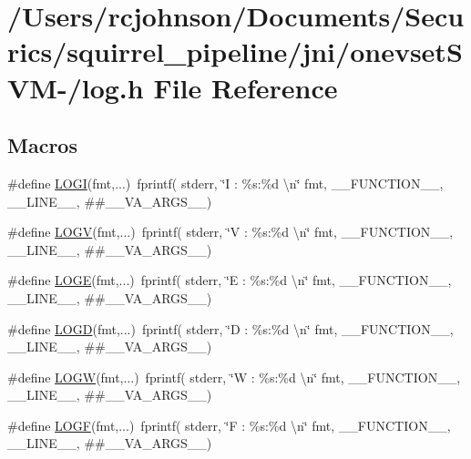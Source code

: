 \hypertarget{onevset_s_v_m-_2log_8h}{\section{/\-Users/rcjohnson/\-Documents/\-Securics/squirrel\-\_\-pipeline/jni/onevset\-S\-V\-M-\//log.h File Reference}
\label{onevset_s_v_m-_2log_8h}
}
\subsection*{Macros}
\begin{DoxyCompactItemize}
\item 
\#define \hyperlink{onevset_s_v_m-_2log_8h_a92abf411d2087c8985085d430336626c}{L\-O\-G\-I}(fmt,...)~fprintf( stderr, \char`\"{}I \-: \%s\-:\%d \textbackslash{}n\char`\"{} fmt, \-\_\-\-\_\-\-F\-U\-N\-C\-T\-I\-O\-N\-\_\-\-\_\-, \-\_\-\-\_\-\-L\-I\-N\-E\-\_\-\-\_\-, \#\#\-\_\-\-\_\-\-V\-A\-\_\-\-A\-R\-G\-S\-\_\-\-\_\-)
\item 
\#define \hyperlink{onevset_s_v_m-_2log_8h_ae73e6e027cb8b77a969c9dfcbc8bfc54}{L\-O\-G\-V}(fmt,...)~fprintf( stderr, \char`\"{}V \-: \%s\-:\%d \textbackslash{}n\char`\"{} fmt, \-\_\-\-\_\-\-F\-U\-N\-C\-T\-I\-O\-N\-\_\-\-\_\-, \-\_\-\-\_\-\-L\-I\-N\-E\-\_\-\-\_\-, \#\#\-\_\-\-\_\-\-V\-A\-\_\-\-A\-R\-G\-S\-\_\-\-\_\-)
\item 
\#define \hyperlink{onevset_s_v_m-_2log_8h_aad0ba517f6ba41ca750a26340b91ec85}{L\-O\-G\-E}(fmt,...)~fprintf( stderr, \char`\"{}E \-: \%s\-:\%d \textbackslash{}n\char`\"{} fmt, \-\_\-\-\_\-\-F\-U\-N\-C\-T\-I\-O\-N\-\_\-\-\_\-, \-\_\-\-\_\-\-L\-I\-N\-E\-\_\-\-\_\-, \#\#\-\_\-\-\_\-\-V\-A\-\_\-\-A\-R\-G\-S\-\_\-\-\_\-)
\item 
\#define \hyperlink{onevset_s_v_m-_2log_8h_a48bbf993b1b3c921f9576776376abd2b}{L\-O\-G\-D}(fmt,...)~fprintf( stderr, \char`\"{}D \-: \%s\-:\%d \textbackslash{}n\char`\"{} fmt, \-\_\-\-\_\-\-F\-U\-N\-C\-T\-I\-O\-N\-\_\-\-\_\-, \-\_\-\-\_\-\-L\-I\-N\-E\-\_\-\-\_\-, \#\#\-\_\-\-\_\-\-V\-A\-\_\-\-A\-R\-G\-S\-\_\-\-\_\-)
\item 
\#define \hyperlink{onevset_s_v_m-_2log_8h_a7f332d50cbb255285411ff250e6da404}{L\-O\-G\-W}(fmt,...)~fprintf( stderr, \char`\"{}W \-: \%s\-:\%d \textbackslash{}n\char`\"{} fmt, \-\_\-\-\_\-\-F\-U\-N\-C\-T\-I\-O\-N\-\_\-\-\_\-, \-\_\-\-\_\-\-L\-I\-N\-E\-\_\-\-\_\-, \#\#\-\_\-\-\_\-\-V\-A\-\_\-\-A\-R\-G\-S\-\_\-\-\_\-)
\item 
\#define \hyperlink{onevset_s_v_m-_2log_8h_abf90b9a1dd511a996bcba0a746281601}{L\-O\-G\-F}(fmt,...)~fprintf( stderr, \char`\"{}F \-: \%s\-:\%d \textbackslash{}n\char`\"{} fmt, \-\_\-\-\_\-\-F\-U\-N\-C\-T\-I\-O\-N\-\_\-\-\_\-, \-\_\-\-\_\-\-L\-I\-N\-E\-\_\-\-\_\-, \#\#\-\_\-\-\_\-\-V\-A\-\_\-\-A\-R\-G\-S\-\_\-\-\_\-)
\end{DoxyCompactItemize}


